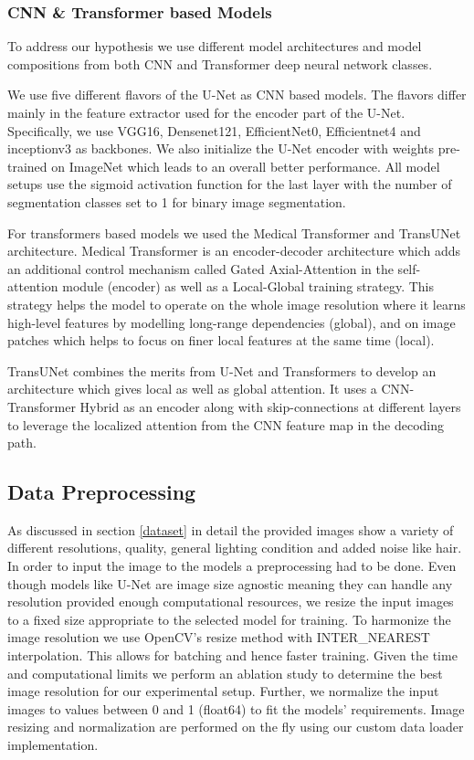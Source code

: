 \subsubsection{CNN \& Transformer based Models}

To address our hypothesis we use different model architectures and model compositions from both CNN and Transformer deep neural network classes.

\par
We use five different flavors of the U-Net as CNN based models. The flavors differ mainly in the feature extractor used for the encoder part of the U-Net. Specifically, we use VGG16, Densenet121, EfficientNet0, Efficientnet4 and inceptionv3 as backbones. We also initialize the U-Net encoder with weights pre-trained on ImageNet which leads to an overall better performance. All model setups use the sigmoid activation function for the last layer with the number of segmentation classes set to 1  for binary image segmentation.

\par
For transformers based models we used the Medical Transformer and TransUNet architecture. Medical Transformer is an encoder-decoder architecture which adds an additional control mechanism called Gated Axial-Attention in the self-attention module (encoder) as well as a Local-Global training strategy. This strategy helps the model to operate on the whole image resolution where it learns high-level features by modelling long-range dependencies (global), and on image patches which helps to focus on finer local features at the same time (local).

\par
TransUNet combines the merits from U-Net and Transformers to develop an architecture which gives local as well as global attention. It uses a CNN-Transformer Hybrid as an encoder along with skip-connections at different layers to leverage the localized attention from the CNN feature map in the decoding path.


\subsection{Data Preprocessing}
As discussed in section \ref{dataset} in detail the provided images show a variety of different resolutions, quality, general lighting condition and added noise like hair. In order to input the image to the models a preprocessing had to be done. Even though models like U-Net are image size agnostic meaning they can handle any resolution provided enough computational resources, we resize the input images to a fixed size appropriate to the selected model for training. To harmonize the image resolution we use OpenCV’s resize method with INTER\_NEAREST interpolation. This allows for batching and hence faster training. Given the time and computational limits we perform an ablation study to determine the best image resolution for our experimental setup. Further, we normalize the input images to values between 0 and 1 (float64) to fit the models’ requirements. Image resizing and normalization are performed on the fly using our custom data loader implementation.


